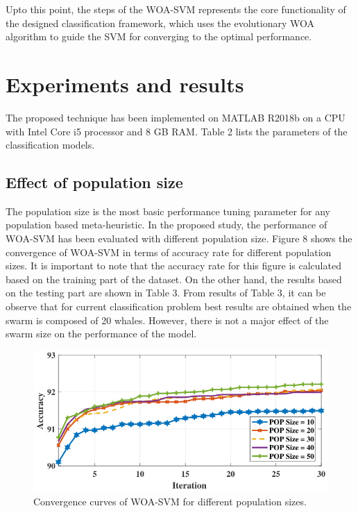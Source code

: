 Upto this point, the steps of the WOA-SVM represents the core functionality of the designed classification framework, which uses the evolutionary WOA algorithm to guide the SVM for converging to the optimal performance.

\section{Experiments and results}

The proposed technique has been implemented on MATLAB R2018b on a CPU with Intel Core i5 processor and 8 GB RAM. Table 2 lists the parameters of the classification models.

\subsection{Effect of population size}

The population size is the most basic performance tuning parameter for any population based meta-heuristic. In the proposed study, the performance of WOA-SVM has been evaluated with different population size. Figure 8 shows the convergence of WOA-SVM in terms of accuracy rate for different population sizes. It is important to note that the accuracy rate for this figure is calculated based on the training part of the dataset. On the other hand, the results based on the testing part are shown in Table 3. From results of Table 3, it can be observe that for current classification problem best results are obtained when the swarm is composed of 20 whales. However, there is not a major effect of the swarm size on the performance of the model.

\begin{figure}[htbp]
\centering
\includegraphics[width=0.8\linewidth]{images/43d14d83c76062f457f9dc0086d5e9adf103e161a24a04f5af03173f16073b4b.jpg}
\caption{Convergence curves of WOA-SVM for different population sizes.}
\label{fig:8}
\end{figure}


